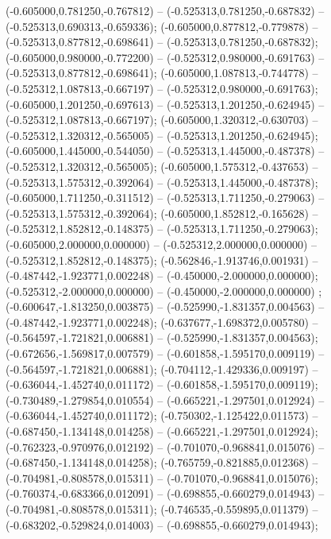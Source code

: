  (-0.605000,0.781250,-0.767812) -- (-0.525313,0.781250,-0.687832) -- (-0.525313,0.690313,-0.659336);
 (-0.605000,0.877812,-0.779878) -- (-0.525313,0.877812,-0.698641) -- (-0.525313,0.781250,-0.687832);
 (-0.605000,0.980000,-0.772200) -- (-0.525312,0.980000,-0.691763) -- (-0.525313,0.877812,-0.698641);
 (-0.605000,1.087813,-0.744778) -- (-0.525312,1.087813,-0.667197) -- (-0.525312,0.980000,-0.691763);
 (-0.605000,1.201250,-0.697613) -- (-0.525313,1.201250,-0.624945) -- (-0.525312,1.087813,-0.667197);
 (-0.605000,1.320312,-0.630703) -- (-0.525312,1.320312,-0.565005) -- (-0.525313,1.201250,-0.624945);
 (-0.605000,1.445000,-0.544050) -- (-0.525313,1.445000,-0.487378) -- (-0.525312,1.320312,-0.565005);
 (-0.605000,1.575312,-0.437653) -- (-0.525313,1.575312,-0.392064) -- (-0.525313,1.445000,-0.487378);
 (-0.605000,1.711250,-0.311512) -- (-0.525313,1.711250,-0.279063) -- (-0.525313,1.575312,-0.392064);
 (-0.605000,1.852812,-0.165628) -- (-0.525312,1.852812,-0.148375) -- (-0.525313,1.711250,-0.279063);
 (-0.605000,2.000000,0.000000) -- (-0.525312,2.000000,0.000000) -- (-0.525312,1.852812,-0.148375);
 (-0.562846,-1.913746,0.001931) -- (-0.487442,-1.923771,0.002248) -- (-0.450000,-2.000000,0.000000);
 (-0.525312,-2.000000,0.000000) -- (-0.450000,-2.000000,0.000000) ;
 (-0.600647,-1.813250,0.003875) -- (-0.525990,-1.831357,0.004563) -- (-0.487442,-1.923771,0.002248);
 (-0.637677,-1.698372,0.005780) -- (-0.564597,-1.721821,0.006881) -- (-0.525990,-1.831357,0.004563);
 (-0.672656,-1.569817,0.007579) -- (-0.601858,-1.595170,0.009119) -- (-0.564597,-1.721821,0.006881);
 (-0.704112,-1.429336,0.009197) -- (-0.636044,-1.452740,0.011172) -- (-0.601858,-1.595170,0.009119);
 (-0.730489,-1.279854,0.010554) -- (-0.665221,-1.297501,0.012924) -- (-0.636044,-1.452740,0.011172);
 (-0.750302,-1.125422,0.011573) -- (-0.687450,-1.134148,0.014258) -- (-0.665221,-1.297501,0.012924);
 (-0.762323,-0.970976,0.012192) -- (-0.701070,-0.968841,0.015076) -- (-0.687450,-1.134148,0.014258);
 (-0.765759,-0.821885,0.012368) -- (-0.704981,-0.808578,0.015311) -- (-0.701070,-0.968841,0.015076);
 (-0.760374,-0.683366,0.012091) -- (-0.698855,-0.660279,0.014943) -- (-0.704981,-0.808578,0.015311);
 (-0.746535,-0.559895,0.011379) -- (-0.683202,-0.529824,0.014003) -- (-0.698855,-0.660279,0.014943);
